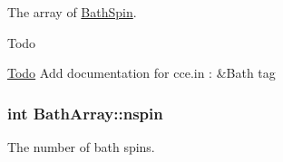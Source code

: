 The array of \hyperlink{structBathSpin}{Bath\-Spin}. 

\begin{DoxyRefDesc}{Todo}
\item[\hyperlink{todo__todo000012}{Todo}]Add documentation for cce.\-in \-: \&Bath tag \end{DoxyRefDesc}
\hypertarget{structBathArray_ac71d275f6b9a2293d80fe8edf69fc46f}{
\subsubsection[{nspin}]{\setlength{\rightskip}{0pt plus 5cm}int Bath\-Array\-::nspin}}\label{structBathArray_ac71d275f6b9a2293d80fe8edf69fc46f}


The number of bath spins. 

